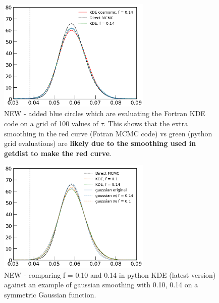 \documentclass[prd,amsmath,amssymb,floatfix,superscriptaddress,nofootinbib]{revtex4-1}
\begin{document}
\begin{figure}
\includegraphics[width=0.65\textwidth]{cosmomc_kde/pl18_relike_tanh_tau_dz0p5_1D_direct_vs_fortran_and_python_kde_with_grid_test.png}
\caption{NEW - added blue circles which are evaluating the Fortran KDE code on a grid of 100 values of $\tau$. This shows that the extra smoothing in the red curve (Fotran MCMC code) vs green (python grid evaluations) are \textbf{likely due to the smoothing used in getdist to make the red curve}.
}
\label{fig:}
\end{figure}


\begin{figure}
\includegraphics[width=0.65\textwidth]{cosmomc_kde/pl18_relike_tanh_tau_dz0p5_1D_direct_vs_fortran_vs_mock_gaussian_fp10_fp14.png
}
\caption{NEW - comparing f = 0.10 and 0.14 in python KDE (latest version) against an example of gaussian smoothing with 0.10, 0.14 on a symmetric Gaussian function.
}
\label{fig:}
\end{figure}
\end{document}
